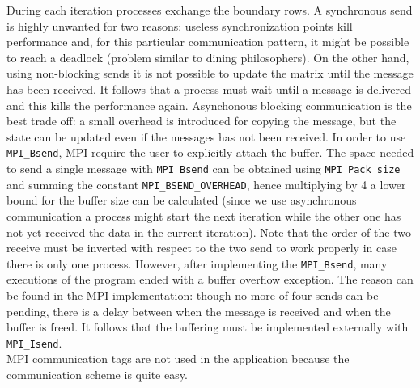 \documentclass{article}
\begin{document}
During each iteration processes exchange the boundary rows. A synchronous send is highly unwanted for two reasons: useless synchronization points kill performance and, for this particular communication pattern, it might be possible to reach a deadlock (problem similar to dining philosophers). On the other hand, using non-blocking sends it is not possible to update the matrix until the message has been received. It follows that a process must wait until a message is delivered and this kills the performance again. Asynchonous blocking communication is the best trade off: a small overhead is introduced for copying the message, but the state can be updated even if the messages has not been received. In order to use \texttt{MPI\_Bsend}, MPI require the user to explicitly attach the buffer. The space needed to send a single message with \texttt{MPI\_Bsend} can be obtained using \texttt{MPI\_Pack\_size} and summing the constant \texttt{MPI\_BSEND\_OVERHEAD}, hence multiplying by 4 a lower bound for the buffer size can be calculated (since we use asynchronous communication a process might start the next iteration while the other one has not yet received the data in the current iteration). Note that the order of the two receive must be inverted with respect to the two send to work properly in case there is only one process. However, after implementing the \texttt{MPI\_Bsend}, many executions of the program ended with a buffer overflow exception. The reason can be found in the MPI implementation: though no more of four sends can be pending, there is a delay between when the message is received and when the buffer is freed. It follows that the buffering must be implemented externally with \texttt{MPI\_Isend}. \\
MPI communication tags are not used in the application because the communication scheme is quite easy.
\end{document}
